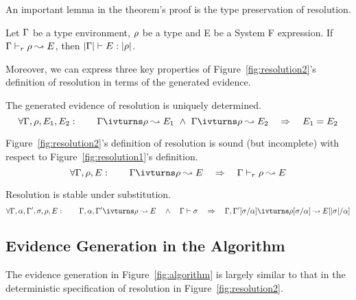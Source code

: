 An important lemma in the theorem's proof is the type preservation of 
resolution.
\begin{lemma}
Let $\Gamma$ be a type environment, $\rho$ be a type and E be a System F expression.
If $\Gamma \vdash_{r} \rho \leadsto E$, then $|\Gamma| \vdash E : |\rho|$.
\end{lemma}

Moreover, we can express three key properties of Figure~\ref{fig:resolution2}'s
definition of resolution in terms of the generated evidence.
\begin{lemma}[Determinacy]
The generated evidence of resolution is uniquely determined.
\[\forall \tenv, \rulet, E_1, E_2: \quad\quad \tenv \ivturns \rulet \leadsto E_1 ~\wedge~ \tenv \ivturns \rulet \leadsto E_2 \quad\Rightarrow\quad E_1 = E_2 \]
\end{lemma}
\begin{lemma}[Soundness]
Figure~\ref{fig:resolution2}'s definition of resolution is sound (but
incomplete) with respect to Figure~\ref{fig:resolution1}'s definition.
\[\forall \tenv, \rulet, E: \quad\quad \tenv \ivturns \rulet \leadsto E \quad\Rightarrow\quad \tenv \vturns \rulet \leadsto E \]
\end{lemma}
\begin{lemma}[Coherence]
Resolution is stable under substitution.
\[\forall \tenv,\alpha,\tenv',\sigma,\rulet, E: \quad\quad 
\tenv,\alpha,\tenv' \ivturns \rulet \leadsto E \quad\wedge\quad \tenv \vdash \sigma
\quad\Rightarrow\quad 
\tenv,\tenv'[\sigma/\alpha] \ivturns \rulet[\sigma/\alpha] \leadsto E[|\sigma|/\alpha] \]
\end{lemma}

\subsection{Evidence Generation in the Algorithm}

The evidence generation in Figure~\ref{fig:algorithm} is largely similar to
that in the deterministic specification of resolution in
Figure~\ref{fig:resolution2}.

